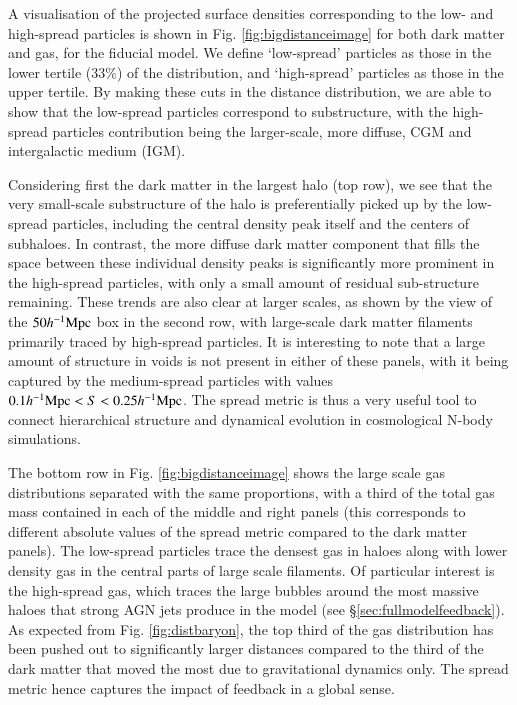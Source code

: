 A visualisation of the projected surface densities corresponding to the low-
and high-spread particles is shown in Fig. \ref{fig:bigdistanceimage} for
both dark matter and gas, for the fiducial \simba{} model. We define
`low-spread' particles as those in the lower tertile (33\%) of the
distribution, and `high-spread' particles as those in the upper tertile. By
making these cuts in the distance distribution, we are able to show that the
low-spread particles correspond to substructure, with the high-spread
particles contribution being the larger-scale, more diffuse, CGM and
intergalactic medium (IGM).


Considering first the dark matter in the largest halo (top row), we see that
the very small-scale substructure of the halo is preferentially picked up by
the low-spread particles, including the central density peak itself and the
centers of subhaloes. In contrast, the more diffuse dark matter component that
fills the space between these individual density peaks is significantly more
prominent in the high-spread particles, with only a small amount of residual
sub-structure remaining. These trends are also clear at larger scales, as
shown by the view of the $50h^{-1}{\rm Mpc}{}$ box in the second row, with large-scale
dark matter filaments primarily traced by high-spread particles. It is
interesting to note that a large amount of structure in voids is not present
in either of these panels, with it being captured by the medium-spread
particles with values $0.1h^{-1}{\rm Mpc}{} < S < 0.25 h^{-1}{\rm Mpc}{}$. The spread
metric is thus a very useful tool to connect hierarchical structure and
dynamical evolution in cosmological N-body simulations.

The bottom row in Fig. \ref{fig:bigdistanceimage} shows the large scale gas
distributions separated with the same proportions, with a third of the total
gas mass contained in each of the middle and right panels (this corresponds
to different absolute values of the spread metric compared to the dark matter
panels). The low-spread particles trace the densest gas in haloes along with
lower density gas in the central parts of large scale filaments. Of
particular interest is the high-spread gas, which traces the large bubbles
around the most massive haloes that strong AGN jets produce in the \simba{}
model (see \S \ref{sec:fullmodelfeedback}). As expected from Fig.
\ref{fig:distbaryon}, the top third of the gas distribution has been pushed out
to significantly larger distances compared to the third of the dark matter that
moved the most due to gravitational dynamics only. The spread metric hence 
captures the impact of feedback in a global sense.


